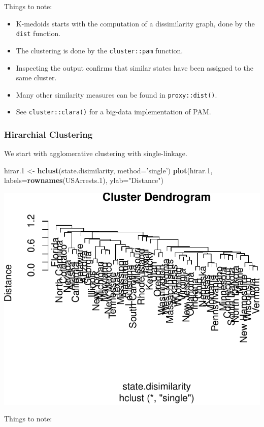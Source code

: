 \documentclass[]{book}
\newenvironment{Shaded}{\begin{snugshade}}{\end{snugshade}}
\newcommand{\KeywordTok}[1]{\textcolor[rgb]{0.13,0.29,0.53}{\textbf{#1}}}
\newcommand{\DataTypeTok}[1]{\textcolor[rgb]{0.13,0.29,0.53}{#1}}
\newcommand{\DecValTok}[1]{\textcolor[rgb]{0.00,0.00,0.81}{#1}}
\newcommand{\StringTok}[1]{\textcolor[rgb]{0.31,0.60,0.02}{#1}}
\newcommand{\NormalTok}[1]{#1}
\providecommand{\tightlist}{%
  \setlength{\itemsep}{0pt}\setlength{\parskip}{0pt}}
\theoremstyle{definition}
\theoremstyle{definition}
\theoremstyle{definition}
\theoremstyle{remark}
\begin{document}
Things to note:

\begin{itemize}
\tightlist
\item
  K-medoids starts with the computation of a dissimilarity graph, done
  by the \texttt{dist} function.
\item
  The clustering is done by the \texttt{cluster::pam} function.
\item
  Inspecting the output confirms that similar states have been assigned
  to the same cluster.
\item
  Many other similarity measures can be found in \texttt{proxy::dist()}.
\item
  See \texttt{cluster::clara()} for a big-data implementation of PAM.
\end{itemize}

\subsubsection{Hirarchial Clustering}\label{hirarchial-clustering-1}

We start with agglomerative clustering with single-linkage.

\begin{Shaded}
\begin{Highlighting}[]
\NormalTok{hirar.}\DecValTok{1}\NormalTok{ <-}\StringTok{ }\KeywordTok{hclust}\NormalTok{(state.disimilarity, }\DataTypeTok{method=}\StringTok{'single'}\NormalTok{)}
\KeywordTok{plot}\NormalTok{(hirar.}\DecValTok{1}\NormalTok{, }\DataTypeTok{labels=}\KeywordTok{rownames}\NormalTok{(USArrests.}\DecValTok{1}\NormalTok{), }\DataTypeTok{ylab=}\StringTok{"Distance"}\NormalTok{)}
\end{Highlighting}
\end{Shaded}

\includegraphics[width=0.5\linewidth]{Rcourse_files/figure-latex/HirarchialClustering-1}

Things to note:
\end{document}
